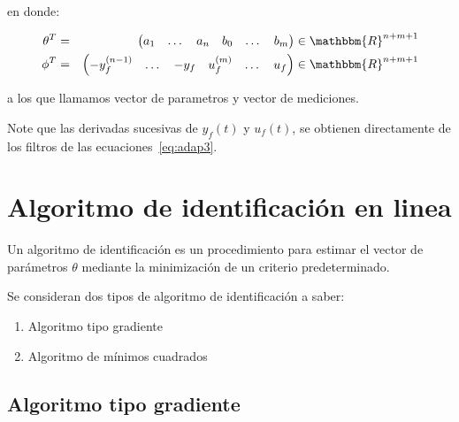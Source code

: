         en donde:

        \begin{eqnarray} \label{eq:adap5}
            \theta^T & = & \begin{pmatrix} a_1 & \dots & a_n & b_0 & \dots & b_m \end{pmatrix} \in \mathbbm{R}^{n+m+1} \nonumber \\
            \phi^T & = & \begin{pmatrix} -y_f^{(n-1)} & \dots & -y_f & u_f^{(m)} & \dots & u_f \end{pmatrix} \in \mathbbm{R}^{n+m+1}
        \end{eqnarray}

        a los que llamamos vector de parametros y vector de mediciones.

        Note que las derivadas sucesivas de $y_f(t)$ y $u_f(t)$, se obtienen directamente de los filtros de las ecuaciones~\ref{eq:adap3}.



    \newpage
    \section{Algoritmo de identificación en linea}

        Un algoritmo de identificación es un procedimiento para estimar el vector de parámetros $\theta$ mediante la minimización de un criterio predeterminado.

        Se consideran dos tipos de algoritmo de identificación a saber:

        \begin{enumerate}
            \item Algoritmo tipo gradiente
            \item Algoritmo de mínimos cuadrados
        \end{enumerate}


        \subsection{Algoritmo tipo gradiente}

